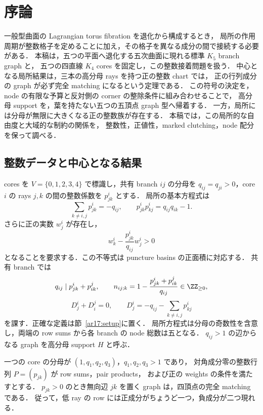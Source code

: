\section{序論}
\label{ar17:introduction}

一般型曲面の Lagrangian torus fibration を退化から構成するとき，
局所の作用周期が整数格子を定めることに加え，その格子を異なる成分の間で接続する必要がある．
本稿は，五つの平面へ退化する五次曲面に現れる標準 $K_5$ branch graph と，
五つの四直線 $K_4$ cores を固定し，この整数接着問題を扱う．
中心となる局所結果は，三本の高分母 rays を持つ正の整数 chart では，
正の行列成分の graph が必ず完全 matching になるという定理である．
この符号の決定を，node の有限な予算と反対側の corner の整除条件に組み合わせることで，
高分母 support を，葉を持たない五つの五頂点 graph 型へ帰着する．
一方，局所には分母が無限に大きくなる正の整数族が存在する．
本稿では，この局所的な自由度と大域的な制約の関係を，
整数性，正値性，marked clutching，node 配分を保って調べる．

\subsection{整数データと中心となる結果}

cores を $V=\{0,1,2,3,4\}$ で標識し，共有 branch $ij$ の分母を
$q_{ij}=q_{ji}>0$，core $i$ の rays $j,k$ の間の整数係数を $p^i_{jk}$ とする．
局所の基本方程式は
\[
 \sum_{k\ne i,j}p^i_{jk}=-q_{ij},\qquad
 p^i_{jk}p^i_{kj}=q_{ij}q_{ik}-1.
\]
さらに正の実数 $w^i_j$ が存在し，
\[
 w^i_k-\frac{p^i_{jk}}{q_{ij}}w^i_j>0
\]
となることを要求する．この不等式は puncture basins の正面積に対応する．
共有 branch では
\[
 q_{ij}\mid p^i_{jk}+p^j_{ik},\qquad
 n_{ij;k}=1-\frac{p^i_{jk}+p^j_{ik}}{q_{ij}}\in\ZZ_{\ge0},
\]
\[
 D^i_j+D^j_i=0,\qquad
 D^i_j=-q_{ij}-\sum_{k\ne i,j}p^i_{kj}
\]
を課す．正確な定義は節~\ref{ar17:setup}に置く．
局所方程式は分母の奇数性を含意し，両端の row sums から各 branch の node 総数は五となる．
$q_{ij}>1$ の辺からなる graph を高分母 support $H$ と呼ぶ．

\begin{theorem}
\label{ar18:main-matching}
一つの core の分母が $(1,q_1,q_2,q_3)$，$q_1,q_2,q_3>1$ であり，
対角成分零の整数行列 $P=(p_{jk})$ が row sums，pair products，
および正の weights の条件を満たすとする．
$p_{jk}>0$ のとき無向辺 $jk$ を置く graph は，四頂点の完全 matching である．
従って，低 ray の row には正成分がちょうど一つ，負成分が二つ現れる．
\end{theorem}

